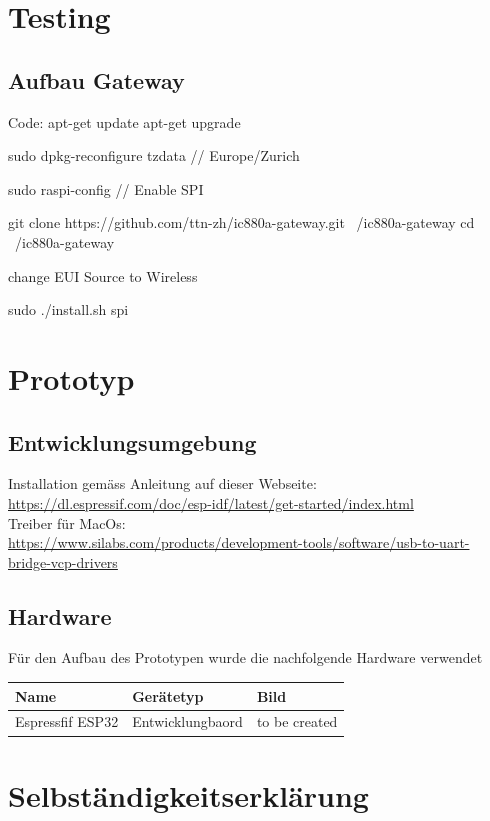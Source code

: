 \documentclass[11pt,english,german]{report}
\theoremstyle{definition}
\begin{document}
\chapter{Testing}
\section{Aufbau Gateway}
Code:
apt-get update
apt-get upgrade

sudo dpkg-reconfigure tzdata // Europe/Zurich

sudo raspi-config // Enable SPI

git clone https://github.com/ttn-zh/ic880a-gateway.git ~/ic880a-gateway
cd ~/ic880a-gateway

change EUI Source to Wireless

sudo ./install.sh spi


\chapter{Prototyp}
\section{Entwicklungsumgebung}
Installation gemäss Anleitung auf dieser Webseite:\\
\url{https://dl.espressif.com/doc/esp-idf/latest/get-started/index.html}\\
Treiber für MacOs:\\
\url{https://www.silabs.com/products/development-tools/software/usb-to-uart-bridge-vcp-drivers}
\section{Hardware}
Für den Aufbau des Prototypen wurde die nachfolgende Hardware verwendet

\begin{table}[htbp]
    \centering
	\begin{tabularx}{\textwidth}{lll}
		Name & Gerätetyp & Bild \\ \hline
		Espressfif ESP32 & Entwicklungbaord & to be created\\ \hline
	\end{tabularx}
\end{table}

\chapter*{Selbständigkeitserklärung}
\label{chap:selbstaendigkeitserklaerung}
\end{document}
